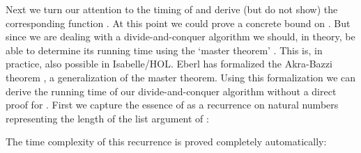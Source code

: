 \begin{isabellebody}
\begin{isamarkuptext}
Next we turn our attention to the timing of 
and derive (but do not show) the corresponding function .
At this point we could prove a concrete bound on .
But since we are dealing with a divide-and-conquer algorithm we should, in theory, be able to determine its
running time using the `master theorem' \cite{Introduction-to-Algorithms:2009}. This is, in practice, also
possible in Isabelle/HOL. Eberl \cite{eberl_akra_bazzi} has formalized the Akra-Bazzi theorem \cite{Akra1998},
a generalization of the master theorem. Using this formalization we can derive the running time of
our divide-and-conquer algorithm without a direct proof for . First
we capture the essence of  as a recurrence on natural numbers
representing the length of the list argument of :
%
\begin{quote}
 \vskip 0pt
\end{quote}

The time complexity of this recurrence is proved completely automatically:

\begin{lemma} \label{lemma:closest_pair_recurrence}
\end{lemma}


\end{isamarkuptext}
\end{isabellebody}
